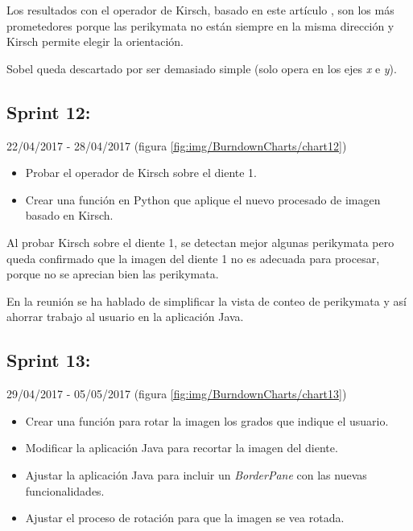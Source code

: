 Los resultados con el operador de Kirsch, basado en este artículo \cite{scholar:venmathi2016kirsch}, son los más prometedores porque las perikymata no están siempre en la misma dirección y Kirsch permite elegir la orientación. 

Sobel \cite{wiki:Sobel} queda descartado por ser demasiado simple (solo opera en los ejes \textit{x} e \textit{y}).

\newpage

\subsection{Sprint 12:}
22/04/2017 - 28/04/2017 (figura \ref{fig:img/BurndownCharts/chart12})
\begin{itemize}
    \item Probar el operador de Kirsch sobre el diente 1.
    \item Crear una función en Python que aplique el nuevo procesado de imagen basado en Kirsch. 
\end{itemize}

Al probar Kirsch sobre el diente 1, se detectan mejor algunas perikymata pero queda confirmado que la imagen del diente 1 no es adecuada para procesar, porque no se aprecian bien las perikymata.

En la reunión se ha hablado de simplificar la vista de conteo de perikymata y así ahorrar trabajo al usuario en la aplicación Java.

\newpage

\subsection{Sprint 13:}
29/04/2017 - 05/05/2017 (figura \ref{fig:img/BurndownCharts/chart13})
\begin{itemize}
    \item Crear una función para rotar la imagen los grados que indique el usuario.
    \item Modificar la aplicación Java para recortar la imagen del diente.
    \item Ajustar la aplicación Java para incluir un \textit{BorderPane} con las nuevas funcionalidades.
    \item Ajustar el proceso de rotación para que la imagen se vea rotada.
\end{itemize}

